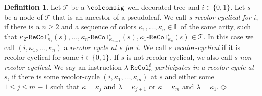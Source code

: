 \documentclass[10pt,a4paper]{amsart}
\theoremstyle{definition}
\numberwithin{equation}{section}
\theoremstyle{plain}
\theoremstyle{definition}
\newtheorem{definition}[definition]{Definition}
\theoremstyle{myexample}
\theoremstyle{plain}
\theoremstyle{definition}
\newcommand{\cols}{\mathbb{L}}
\newcommand{\recol}[2]{#2\pred{\texttt{-}ReCol}_{#1}}
\newcommand{\pred}[1]{\mathtt{#1}}
\newcommand{\defend}{\hfill\ensuremath{\Diamond}}
\begin{document}
\begin{definition}\label{def:recolcycl}
	Let $\mathcal{T}$ be a $\colconsig$-well-decorated tree and $i\in\{ 0,1 \}$. Let $s$ be a node of $\mathcal{T}$ that is an ancestor of a pseudoleaf. We call $s$ \emph{recolor-cyclical for $i$}, if there is a $n\ge 2$ and a sequence of colors $\kappa_1, \ldots, \kappa_n\in\cols$ of the same arity, such that $\recol{\kappa_1}{\kappa_2}^{i}(s), \ldots, \recol{\kappa_{n-1}}{\kappa_n}^{i}(s), \recol{\kappa_n}{\kappa_1}^{i}(s)\in\mathcal{T}$. In this case we call $(i, \kappa_1, \ldots, \kappa_n)$ a \emph{recolor cycle at $s$ for $i$}. We call $s$ \emph{recolor-cyclical} if it is recolor-cyclical for some $i\in\{ 0,1 \}$. If $s$ is not recolor-cyclical, we also call $s$ \emph{non-recolor-cyclical}.
	We say an instruction $\recol{\kappa}{\lambda}^{i}$ \emph{participates in a recolor-cycle at $s$}, if there is some recolor-cycle $(i, \kappa_1, \ldots, \kappa_m)$ at $s$ and either some $1\le j \le m-1$ such that $\kappa = \kappa_j$ and $\lambda = \kappa_{j+1}$ or $\kappa = \kappa_m$ and $\lambda = \kappa_1$.\defend
\end{definition}
\allowdisplaybreaks
\end{document}
